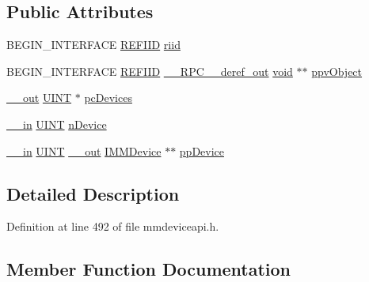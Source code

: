 \subsection*{Public Attributes}
\begin{DoxyCompactItemize}
\item 
B\+E\+G\+I\+N\+\_\+\+I\+N\+T\+E\+R\+F\+A\+CE \hyperlink{px__win__ds_8c_a80ec49c8ae61e234197d5071d2df497d}{R\+E\+F\+I\+ID} \hyperlink{struct_i_m_m_device_collection_vtbl_a424e4f5299e4e25e5ded2132fc0451fe}{riid}
\item 
B\+E\+G\+I\+N\+\_\+\+I\+N\+T\+E\+R\+F\+A\+CE \hyperlink{px__win__ds_8c_a80ec49c8ae61e234197d5071d2df497d}{R\+E\+F\+I\+ID} \hyperlink{rpcsal_8h_a23bc188526f10656f9c79d950f6c3192}{\+\_\+\+\_\+\+R\+P\+C\+\_\+\+\_\+deref\+\_\+out} \hyperlink{sound_8c_ae35f5844602719cf66324f4de2a658b3}{void} $\ast$$\ast$ \hyperlink{struct_i_m_m_device_collection_vtbl_af22a0c04f1ca95c91ae72b01aba017fa}{ppv\+Object}
\item 
\hyperlink{sal_8h_abb4c3c1135aab6c47cff22e7c16efb74}{\+\_\+\+\_\+out} \hyperlink{mapinls_8h_a36cb3b01d81ffd844bbbfb54003e06ec}{U\+I\+NT} $\ast$ \hyperlink{struct_i_m_m_device_collection_vtbl_a72c968f5f5026e5d3056d3578a903ef1}{pc\+Devices}
\item 
\hyperlink{sal_8h_a3f6b8655e1aa9dfc15a9029f0343009e}{\+\_\+\+\_\+in} \hyperlink{mapinls_8h_a36cb3b01d81ffd844bbbfb54003e06ec}{U\+I\+NT} \hyperlink{struct_i_m_m_device_collection_vtbl_a47ebd4d63fad05206eb59e961d5b79f2}{n\+Device}
\item 
\hyperlink{sal_8h_a3f6b8655e1aa9dfc15a9029f0343009e}{\+\_\+\+\_\+in} \hyperlink{mapinls_8h_a36cb3b01d81ffd844bbbfb54003e06ec}{U\+I\+NT} \hyperlink{sal_8h_abb4c3c1135aab6c47cff22e7c16efb74}{\+\_\+\+\_\+out} \hyperlink{mmdeviceapi_8h_a8d4cacf41e022eb8b6aed6231bcf54be}{I\+M\+M\+Device} $\ast$$\ast$ \hyperlink{struct_i_m_m_device_collection_vtbl_a3543ad84c99d3a118199115cd2d6e77b}{pp\+Device}
\end{DoxyCompactItemize}


\subsection{Detailed Description}


Definition at line 492 of file mmdeviceapi.\+h.



\subsection{Member Function Documentation}
